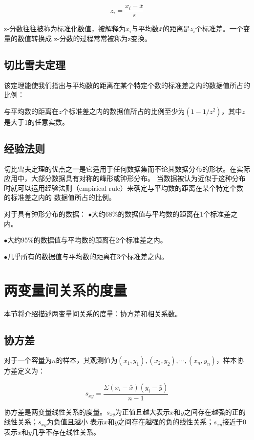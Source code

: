 \documentclass[a4paper]{ctexrep}
\begin{document}
\[z_{i}=\frac{x_{i}-\bar{x}}{s}\]

z-分数往往被称为标准化数值，被解释为$x_{i}$与平均数$\bar{x}$的距离是$z_{i}$个标准差。一个变量的数值转换成
z-分数的过程常常被称为z变换。

\subsection{切比雪夫定理}
该定理能使我们指出与平均数的距离在某个特定个数的标准差之内的数据值所占的比例：

与平均数的距离在$z$个标准差之内的数据值所占的比例至少为$(1-1/z^{2})$，其中$z$是大于1的任意实数。

\subsection{经验法则}
切比雪夫定理的优点之一是它适用于任何数据集而不论其数据分布的形状。在实际应用中，大部分数据具有对称的峰形或钟形分布。
当数据被认为近似于这种分布时就可以运用经验法则（empirical rule）来确定与平均数的距离在某个特定个数的标准差之内的
数据值所占的比例。
\begin{tcolorbox}[title = {经验法则}]
对于具有钟形分布的数据：
\tcblower
$\bullet$大约68\%的数据值与平均数的距离在1个标准差之内。

$\bullet$大约95\%的数据值与平均数的距离在2个标准差之内。

$\bullet$几乎所有的数据值与平均数的距离在3个标准差之内。
\end{tcolorbox}


\section{两变量间关系的度量}
本节将介绍描述两变量间关系的度量：协方差和相关系数。

\subsection{协方差}
对于一个容量为$n$的样本，其观测值为$(x_{1},y_{1}),(x_{2},y_{2}),\cdots,(x_{n},y_{n})$，样本协方差定义为：
\begin{tcolorbox}[title = {样本协方差}]
\[s_{xy}=\frac{\Sigma(x_{i}-\bar{x})(y_{i}-\bar{y})}{n-1}\]
\end{tcolorbox}
协方差是两变量线性关系的度量。$s_{xy}$为正值且越大表示$x$和$y$之间存在越强的正的线性关系；$s_{xy}$为负值且越小
表示$x$和$y$之间存在越强的负的线性关系；$s_{xy}$接近于0表示$x$和$y$几乎不存在线性关系。
\end{document}
